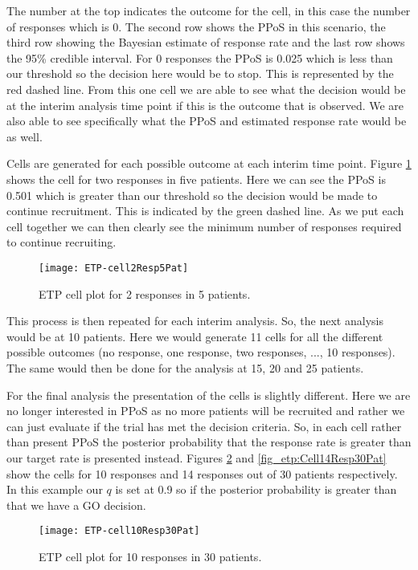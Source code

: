 The number at the top indicates the outcome for the cell, in this case the number of responses which is 0. The second row shows the PPoS in this scenario, the third row showing the Bayesian estimate of response rate and the last row shows the 95\% credible interval. For 0 responses the PPoS is 0.025 which is less than our threshold so the decision here would be to stop. This is represented by the red dashed line. From this one cell we are able to see what the decision would be at the interim analysis time point if this is the outcome that is observed. We are also able to see specifically what the PPoS and estimated response rate would be as well.  

Cells are generated for each possible outcome at each interim time point. Figure \ref{fig_etp:Cell2Resp5Pat} shows the cell for two responses in five patients. Here we can see the PPoS is 0.501 which is greater than our threshold so the decision would be made to continue recruitment. This is indicated by the green dashed line. As we put each cell together we can then clearly see the minimum number of responses required to continue recruiting.  

\begin{figure}[h!]
	\centering
	\caption{ETP cell plot for 2 responses in 5 patients.}
	\label{fig_etp:Cell2Resp5Pat}
	\texttt{[image: ETP-cell2Resp5Pat]}
\end{figure}

This process is then repeated for each interim analysis. So, the next analysis would be at 10 patients. Here we would generate 11 cells for all the different possible outcomes (no response, one response, two responses, ..., 10 responses). The same would then be done for the analysis at 15, 20 and 25 patients. 

For the final analysis the presentation of the cells is slightly different. Here we are no longer interested in PPoS as no more patients will be recruited and rather we can just evaluate if the trial has met the decision criteria. So, in each cell rather than present PPoS the posterior probability that the response rate is greater than our target rate is presented instead. Figures \ref{fig_etp:Cell10Resp30Pat} and \ref{fig_etp:Cell14Resp30Pat} show the cells for 10 responses and 14 responses out of 30 patients respectively. In this example our $q$ is set at 0.9 so if the posterior probability is greater than that we have a GO decision. 


\begin{figure}[h!]
	\centering
	\caption{ETP cell plot for 10 responses in 30 patients.}
	\label{fig_etp:Cell10Resp30Pat}
	\texttt{[image: ETP-cell10Resp30Pat]}
\end{figure}


